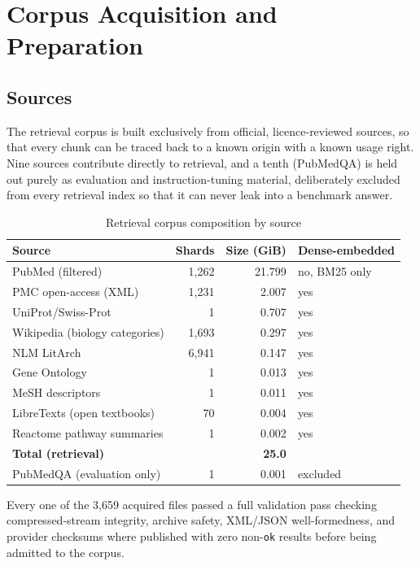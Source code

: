 \section{Corpus Acquisition and Preparation}\label{3.2}

\subsection{Sources}\label{3.2.1}

The retrieval corpus is built exclusively from official, licence-reviewed
sources, so that every chunk can be traced back to a known origin with a
known usage right. Nine sources contribute directly to retrieval, and a
tenth (PubMedQA) is held out purely as evaluation and instruction-tuning
material, deliberately excluded from every retrieval index so that it can
never leak into a benchmark answer.

\begin{table}[h]
\centering
\caption{Retrieval corpus composition by source}
\label{tab:3.1}
\footnotesize
\begin{tabular}{@{}lrrl@{}}
\toprule
\textbf{Source} & \textbf{Shards} & \textbf{Size (GiB)} & \textbf{Dense-embedded} \\
\midrule
PubMed (filtered) & 1{,}262 & 21.799 & no, BM25 only \\
PMC open-access (XML) & 1{,}231 & 2.007 & yes \\
UniProt/Swiss-Prot & 1 & 0.707 & yes \\
Wikipedia (biology categories) & 1{,}693 & 0.297 & yes \\
NLM LitArch & 6{,}941 & 0.147 & yes \\
Gene Ontology & 1 & 0.013 & yes \\
MeSH descriptors & 1 & 0.011 & yes \\
LibreTexts (open textbooks) & 70 & 0.004 & yes \\
Reactome pathway summaries & 1 & 0.002 & yes \\
\midrule
\textbf{Total (retrieval)} & & \textbf{25.0} & \\
PubMedQA (evaluation only) & 1 & 0.001 & excluded \\
\bottomrule
\end{tabular}
\end{table}

Every one of the 3{,}659 acquired files passed a full validation pass checking
compressed-stream integrity, archive safety, XML/JSON well-formedness, and
provider checksums where published with zero non-\texttt{ok} results
before being admitted to the corpus.

